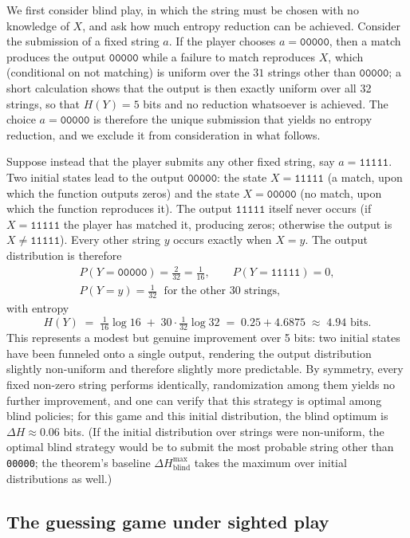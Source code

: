 \documentclass[11pt]{article}
\begin{document}
We first consider blind play, in which the string must be chosen with no knowledge of $X$, and ask how much entropy reduction can be achieved. Consider the submission of a fixed string $a$. If the player chooses $a = \texttt{00000}$, then a match produces the output $\texttt{00000}$ while a failure to match reproduces $X$, which (conditional on not matching) is uniform over the $31$ strings other than $\texttt{00000}$; a short calculation shows that the output is then exactly uniform over all 32 strings, so that $H(Y) = 5$ bits and no reduction whatsoever is achieved. The choice $a = \texttt{00000}$ is therefore the unique submission that yields no entropy reduction, and we exclude it from consideration in what follows.

Suppose instead that the player submits any other fixed string, say $a = \texttt{11111}$. Two initial states lead to the output $\texttt{00000}$: the state $X = \texttt{11111}$ (a match, upon which the function outputs zeros) and the state $X = \texttt{00000}$ (no match, upon which the function reproduces it). The output $\texttt{11111}$ itself never occurs (if $X = \texttt{11111}$ the player has matched it, producing zeros; otherwise the output is $X \ne \texttt{11111}$). Every other string $y$ occurs exactly when $X = y$. The output distribution is therefore
\begin{gather*}
P(Y = \texttt{00000}) = \tfrac{2}{32} = \tfrac1{16}, \qquad
P(Y = \texttt{11111}) = 0,\\
P(Y = y) = \tfrac1{32} \;\text{ for the other 30 strings},
\end{gather*}
with entropy
\[
H(Y) \;=\; \tfrac{1}{16}\log 16 \;+\; 30 \cdot \tfrac{1}{32} \log 32 \;=\; 0.25 + 4.6875 \;\approx\; 4.94 \text{ bits}.
\]
This represents a modest but genuine improvement over 5 bits: two initial states have been funneled onto a single output, rendering the output distribution slightly non-uniform and therefore slightly more predictable. By symmetry, every fixed non-zero string performs identically, randomization among them yields no further improvement, and one can verify that this strategy is optimal among blind policies; for this game and this initial distribution, the blind optimum is $\Delta H \approx 0.06$ bits. (If the initial distribution over strings were non-uniform, the optimal blind strategy would be to submit the most probable string other than \texttt{00000}; the theorem's baseline $\Delta H^{\max}_{\text{blind}}$ takes the maximum over initial distributions as well.)

\subsection{The guessing game under sighted play}
\label{sec:gamesighted}
\end{document}
